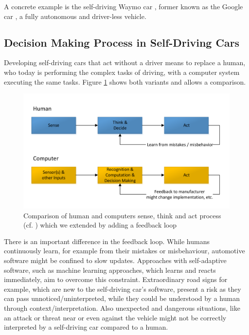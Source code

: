 A concrete example is the self-driving Waymo car \cite{Waymo2017}, former known as the Google car \cite{Google2016}, a fully autonomous and driver-less vehicle. 


\subsection{Decision Making Process in Self-Driving Cars}
\label{sec:SelfDrivingCarsBasics:DecisionMakingProcess}

Developing self-driving cars that act without a driver means to replace a human, who today is performing the complex tasks of driving, with a computer system executing the same tasks. Figure  \ref{fig:ComparisonHumanComputerProcess} shows both variants and allows a comparison. 

\begin{figure}
\centering
\includegraphics[width=1\linewidth]{Figures/Figures_V20171008_SenseDecideAct.pdf}
\caption{Comparison of human and computers sense, think and act process (cf. \cite{Ghisio2016}) which we extended by adding a feedback loop}
\label{fig:ComparisonHumanComputerProcess}
\end{figure}


There is an important difference in the feedback loop. While humans continuously learn, for example from their mistakes or misbehaviour, automotive software might be confined to slow updates. Approaches with self-adaptive software, such as machine learning approaches, which learns and reacts immediately, aim to overcome this constraint. Extraordinary road signs for example, which are new to the self-driving car's software, present a risk as they can pass unnoticed/uninterpreted, while they could be understood by a human through context/interpretation. Also unexpected and dangerous situations, like an attack or threat near or even against the vehicle might not be correctly interpreted by a self-driving car compared to a human. 

